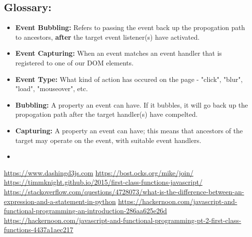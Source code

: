 \documentclass[8pt,a4paper]{extarticle}
\begin{document}
\subsection*{Glossary:}
\begin{itemize}
\item \textbf{Event Bubbling:} Refers to passing the event back up the propogation path to ancestors, \textbf{after} the target event listener(s) have activated.
\item \textbf{Event Capturing:} When an event matches an event handler that is registered to one of our DOM elements.
\item \textbf{Event Type:} What kind of action has occured on the page - "click", "blur", "load", "mouseover", etc.
\item \textbf{Bubbling:} A property an event can have. If it bubbles, it will go back up the propogation path after the target handler(s) have compelted.
\item \textbf{Capturing:} A property an event can have; this means that ancestors of the target may operate on the event, with suitable event handlers.
\item 

\end{itemize}



\begin{thebibliography}{9}

\url{https://www.dashingd3js.com}
\url{https://bost.ocks.org/mike/join/}
\url{https://timmknight.github.io/2015/first-class-functions-javascript/}
\url{https://stackoverflow.com/questions/4728073/what-is-the-difference-between-an-expression-and-a-statement-in-python}
\url{https://hackernoon.com/javascript-and-functional-programming-an-introduction-286aa625e26d}
\url{https://hackernoon.com/javascript-and-functional-programming-pt-2-first-class-functions-4437a1aec217}
	
\end{thebibliography}
\end{document}
